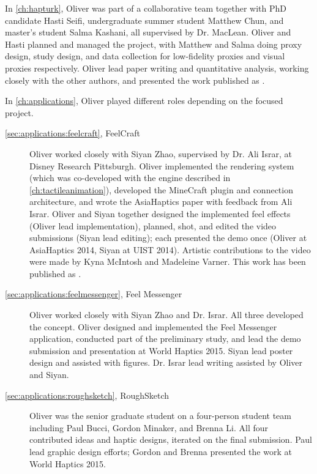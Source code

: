 In \autoref{ch:hapturk}, Oliver was part of a collaborative team together with PhD candidate Hasti Seifi, undergraduate summer student Matthew Chun, and master's student Salma Kashani, all supervised by Dr. MacLean.
Oliver and Hasti planned and managed the project, with Matthew and Salma doing proxy design, study design, and data collection for low-fidelity proxies and visual proxies respectively.
Oliver lead paper writing and quantitative analysis, working closely with the other authors, and presented the work published as \citet{Schneider2016hapturk}.

In \autoref{ch:applications}, Oliver played different roles depending on the focused project.
\begin{description}

\item[\autoref{sec:applications:feelcraft}, FeelCraft] Oliver worked closely with Siyan Zhao, supervised by Dr. Ali Israr, at Disney Research Pittsburgh.
Oliver implemented the rendering system (which was co-developed with the engine described in \autoref{ch:tactileanimation}), developed the MineCraft plugin and connection architecture, and wrote the AsiaHaptics paper with feedback from Ali Israr.
Oliver and Siyan together designed the implemented feel effects (Oliver lead implementation), planned, shot, and edited the video submissions (Siyan lead editing); each presented the demo once (Oliver at AsiaHaptics 2014, Siyan at UIST 2014).
Artistic contributions to the video were made by Kyna McIntosh and Madeleine Varner.
This work has been published as \citet{SchneiderAsiaHaptics2014,Schneider-demo-feelcraftUIST2014}.

\item[\autoref{sec:applications:feelmessenger}, Feel Messenger] Oliver worked closely with Siyan Zhao and Dr. Israr.
All three developed the concept.
Oliver designed and implemented the Feel Messenger application, conducted part of the preliminary study, and lead the demo submission and presentation at World Haptics 2015.
Siyan lead poster design and assisted with figures.
Dr. Israr lead writing assisted by Oliver and Siyan.


\item[\autoref{sec:applications:roughsketch}, RoughSketch] Oliver was the senior graduate student on a four-person student team including Paul Bucci, Gordon Minaker, and Brenna Li.
All four contributed ideas and haptic designs, iterated on the final submission.
Paul lead graphic design efforts; Gordon and Brenna presented the work at World Haptics 2015.


\end{description}
